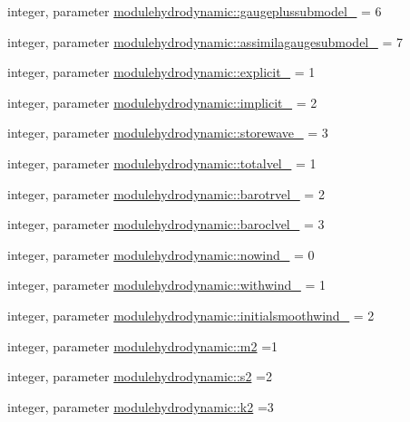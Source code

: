 \begin{DoxyCompactItemize}
\item 
integer, parameter \mbox{\hyperlink{namespacemodulehydrodynamic_a28c716327ca5feea01660b87cd07832f}{modulehydrodynamic\+::gaugeplussubmodel\+\_\+}} = 6
\item 
integer, parameter \mbox{\hyperlink{namespacemodulehydrodynamic_a877761a178361bd0759b6eb504b4261b}{modulehydrodynamic\+::assimilagaugesubmodel\+\_\+}} = 7
\item 
integer, parameter \mbox{\hyperlink{namespacemodulehydrodynamic_a343f819d2ce13e5a48592e61480859e3}{modulehydrodynamic\+::explicit\+\_\+}} = 1
\item 
integer, parameter \mbox{\hyperlink{namespacemodulehydrodynamic_a80b5961d5720bcc727a4d9a385746fb4}{modulehydrodynamic\+::implicit\+\_\+}} = 2
\item 
integer, parameter \mbox{\hyperlink{namespacemodulehydrodynamic_a01481fb764815f271a203b9a3217a82b}{modulehydrodynamic\+::storewave\+\_\+}} = 3
\item 
integer, parameter \mbox{\hyperlink{namespacemodulehydrodynamic_a3817721a2c1e25ad61d2dc3d1e615d01}{modulehydrodynamic\+::totalvel\+\_\+}} = 1
\item 
integer, parameter \mbox{\hyperlink{namespacemodulehydrodynamic_af69ee115e707ec60f646d5fc16cfec7d}{modulehydrodynamic\+::barotrvel\+\_\+}} = 2
\item 
integer, parameter \mbox{\hyperlink{namespacemodulehydrodynamic_a3537e1baf7f7e53403105b6b87782666}{modulehydrodynamic\+::baroclvel\+\_\+}} = 3
\item 
integer, parameter \mbox{\hyperlink{namespacemodulehydrodynamic_a248280a5bc3da1d659964d81eb43acee}{modulehydrodynamic\+::nowind\+\_\+}} = 0
\item 
integer, parameter \mbox{\hyperlink{namespacemodulehydrodynamic_a628900d53c3dc0e8656ea6a73ab48369}{modulehydrodynamic\+::withwind\+\_\+}} = 1
\item 
integer, parameter \mbox{\hyperlink{namespacemodulehydrodynamic_a43bf77c32807959996e9d30b8054ccfb}{modulehydrodynamic\+::initialsmoothwind\+\_\+}} = 2
\item 
integer, parameter \mbox{\hyperlink{namespacemodulehydrodynamic_aec21ace8f453043ef4fa34993ebc1805}{modulehydrodynamic\+::m2}} =1
\item 
integer, parameter \mbox{\hyperlink{namespacemodulehydrodynamic_aab740b482f765990a3baedfcdd5c7010}{modulehydrodynamic\+::s2}} =2
\item 
integer, parameter \mbox{\hyperlink{namespacemodulehydrodynamic_a6a549f15a585bad1d81626be37e5a2ee}{modulehydrodynamic\+::k2}} =3

\end{DoxyCompactItemize}
